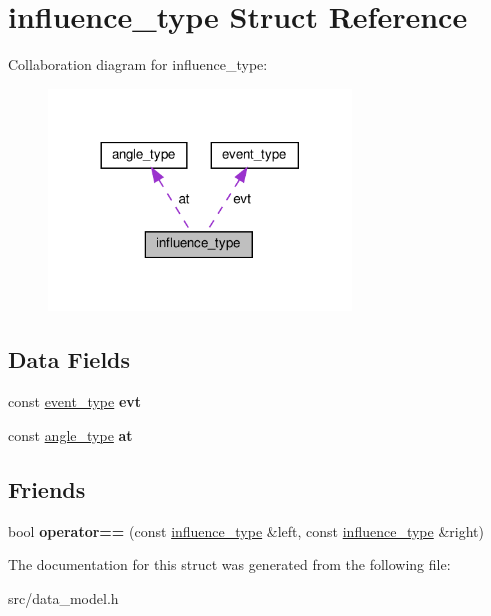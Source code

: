 \hypertarget{structinfluence__type}{}\section{influence\+\_\+type Struct Reference}
\label{structinfluence__type}


Collaboration diagram for influence\+\_\+type\+:
\nopagebreak
\begin{figure}[H]
\begin{center}
\leavevmode
\includegraphics[width=228pt]{df/d32/structinfluence__type__coll__graph}
\end{center}
\end{figure}
\subsection*{Data Fields}
\begin{DoxyCompactItemize}
\item 
\mbox{\label{structinfluence__type_a54609d8fd03b51d5a1961db4739af731}} 
const \hyperlink{structevent__type}{event\+\_\+type} {\bfseries evt}
\item 
\mbox{\label{structinfluence__type_a1232197d61a8bebc4d5c64ec54745aa3}} 
const \hyperlink{structangle__type}{angle\+\_\+type} {\bfseries at}
\end{DoxyCompactItemize}
\subsection*{Friends}
\begin{DoxyCompactItemize}
\item 
\mbox{\label{structinfluence__type_a4f5b42686b09f580c15f8fa9f3aa296f}} 
bool {\bfseries operator==} (const \hyperlink{structinfluence__type}{influence\+\_\+type} \&left, const \hyperlink{structinfluence__type}{influence\+\_\+type} \&right)
\end{DoxyCompactItemize}


The documentation for this struct was generated from the following file\+:\begin{DoxyCompactItemize}
\item 
src/data\+\_\+model.\+h\end{DoxyCompactItemize}
